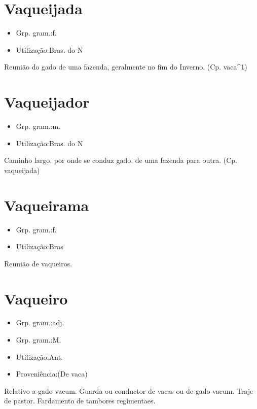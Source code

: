 \documentclass{article}
\begin{document}
\section{Vaqueijada}
\begin{itemize}
\item {Grp. gram.:f.}
\end{itemize}
\begin{itemize}
\item {Utilização:Bras. do N}
\end{itemize}
Reunião do gado de uma fazenda, geralmente no fim do Inverno.
(Cp. \textunderscore vaca\textunderscore ^1)
\section{Vaqueijador}
\begin{itemize}
\item {Grp. gram.:m.}
\end{itemize}
\begin{itemize}
\item {Utilização:Bras. do N}
\end{itemize}
Caminho largo, por onde se conduz gado, de uma fazenda para outra.
(Cp. \textunderscore vaqueijada\textunderscore )
\section{Vaqueirama}
\begin{itemize}
\item {Grp. gram.:f.}
\end{itemize}
\begin{itemize}
\item {Utilização:Bras}
\end{itemize}
Reunião de vaqueiros.
\section{Vaqueiro}
\begin{itemize}
\item {Grp. gram.:adj.}
\end{itemize}
\begin{itemize}
\item {Grp. gram.:M.}
\end{itemize}
\begin{itemize}
\item {Utilização:Ant.}
\end{itemize}
\begin{itemize}
\item {Proveniência:(De \textunderscore vaca\textunderscore )}
\end{itemize}
Relativo a gado vacum.
Guarda ou conductor de vacas ou de gado vacum.
Traje de pastor.
Fardamento de tambores regimentaes.
\end{document}
